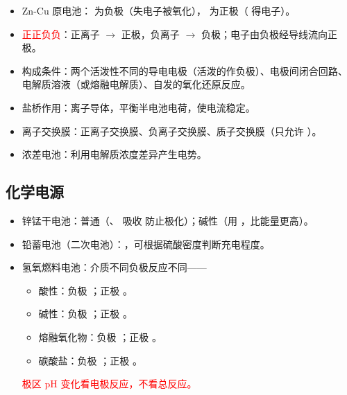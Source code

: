             \begin{itemize}
                \item Zn-Cu 原电池： 为负极（失电子被氧化）， 为正极（ 得电子）。
                \item \textcolor{red}{正正负负}：正离子 \(\to\) 正极，负离子 \(\to\) 负极；电子由负极经导线流向正极。
                \item 构成条件：两个活泼性不同的导电电极（活泼的作负极）、电极间闭合回路、电解质溶液（或熔融电解质）、自发的氧化还原反应。
                \item 盐桥作用：离子导体，平衡半电池电荷，使电流稳定。
                \item 离子交换膜：正离子交换膜、负离子交换膜、质子交换膜（只允许 ）。
                \item 浓差电池：利用电解质浓度差异产生电势。
            \end{itemize}

        \subsection{化学电源}

            \begin{itemize}
                \item 锌锰干电池：普通（、 吸收  防止极化）；碱性（用 ，比能量更高）。
                \item 铅蓄电池（二次电池）：，可根据硫酸密度判断充电程度。
                \item 氢氧燃料电池：介质不同负极反应不同——
                \begin{itemize}
                    \item 酸性：负极 ；正极 。
                    \item 碱性：负极 ；正极 。
                    \item 熔融氧化物：负极 ；正极 。
                    \item 碳酸盐：负极 ；正极 。
                \end{itemize}
                \textcolor{red}{极区 pH 变化看电极反应，不看总反应。}
            \end{itemize}

